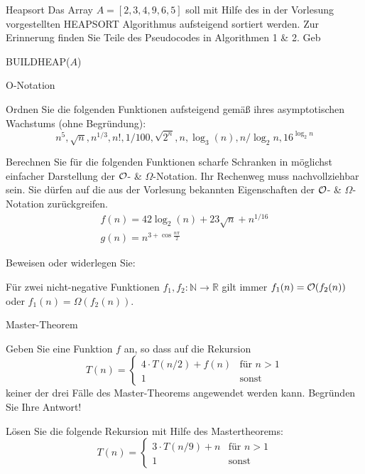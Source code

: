 \documentclass{exercisesheet}
\begin{document}
\begin{exercise}{Heapsort}
  Das Array $A = [2,3,4,9,6,5]$ soll mit Hilfe des in der Vorlesung vorgestellten HEAPSORT Algorithmus aufsteigend sortiert werden. Zur Erinnerung finden Sie Teile des Pseudocodes in Algorithmen 1 \& 2. Geb
  \begin{algorithm}[ht]
    \caption{HEAPSORT($A$)}
    BUILDHEAP($A$) \\
  \end{algorithm}
\end{exercise}

\begin{exercises}{O-Notation}
\item Ordnen Sie die folgenden Funktionen aufsteigend gemäß ihres asymptotischen Wachstums (ohne Begründung):
\begin{equation*}
  n^5,\sqrt{n},n^{1/3},n!,1/100,\sqrt{2^n},n,\log_3(n),n/\log_2{n},16^{\log_2{n}}
\end{equation*}
\item Berechnen Sie für die folgenden Funktionen scharfe Schranken in möglichst einfacher Darstellung der $\mathcal{O}$- \& $\Omega$-Notation. Ihr Rechenweg muss nachvollziehbar sein. Sie dürfen auf die aus der Vorlesung bekannten Eigenschaften der $\mathcal{O}$- \& $\Omega$-Notation zurückgreifen.
\begin{align*}
  f(n) = 42\log_2(n) + 23\sqrt{n} + n^{1/16} \\
  g(n) = n^{3+\cos{\frac{n\pi}{2}}}
\end{align*}
\item Beweisen oder widerlegen Sie:\par Für zwei nicht-negative Funktionen $f_1, f_2: \mathbb{N} \to \mathbb{R}$ gilt immer $f_1(n) = \mathcal{O}(f_2(n))$ oder $f_1(n) = \Omega(f_2(n))$.
\end{exercises}

\begin{exercises}{Master-Theorem}
\item Geben Sie eine Funktion $f$ an, so dass auf die Rekursion
\begin{equation*}
  T(n) = \begin{cases}
    4\cdot T(n/2) + f(n) & \text{für } n > 1 \\
    1                    & \text{sonst}
  \end{cases}
\end{equation*}
keiner der drei Fälle des Master-Theorems angewendet werden kann. Begründen Sie Ihre Antwort!
\item Lösen Sie die folgende Rekursion mit Hilfe des Mastertheorems:
\begin{equation*}
  T(n) = \begin{cases}
    3\cdot T(n/9) + n & \text{für } n > 1 \\
    1                 & \text{sonst}
  \end{cases}
\end{equation*}
\end{exercises}
\end{document}
